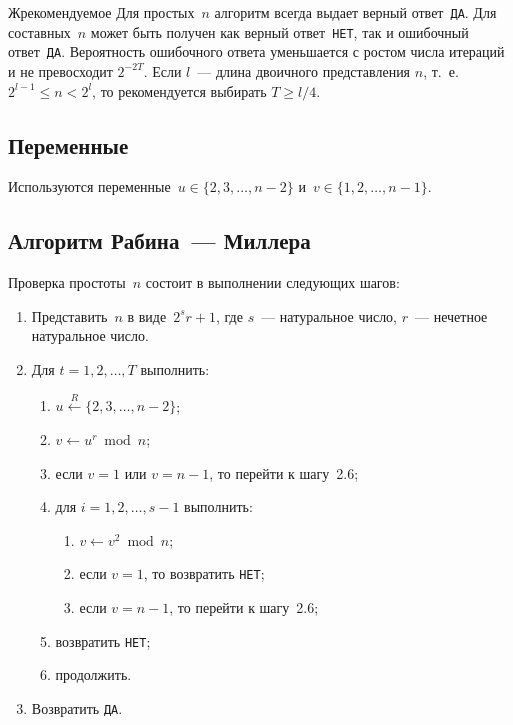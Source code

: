 \begin{appendix}{Ж}{рекомендуемое}
Для простых~$n$ алгоритм всегда выдает верный ответ~\texttt{ДА}. 
%
Для составных~$n$ может быть получен как верный ответ~\texttt{НЕТ},
так и ошибочный ответ~\texttt{ДА}. 
Вероятность ошибочного ответа уменьшается с ростом числа итераций
и не превосходит $2^{-2T}$.
Если $l$~--- длина двоичного представления $n$, т.~е. $2^{l-1}\leq n<2^l$,
то рекомендуется выбирать $T\geq l/4$.

\subsection{Переменные}

Используются переменные~$u\in\{2,3,\ldots,n-2\}$
и~$v\in\{1,2,\ldots,n-1\}$.

\subsection{Алгоритм Рабина~--- Миллера}\label{PRIMEQ.Alg}

Проверка простоты~$n$ состоит в выполнении следующих шагов:
\begin{enumerate}
\item
Представить~$n$ в виде~$2^s r + 1$,
где $s$~--- натуральное число, $r$~--- нечетное натуральное число.

\item
Для $t=1,2,\ldots,T$ выполнить:
\begin{enumerate}
\item
$u\stackrel{R}{\leftarrow}\{2,3,\ldots,n-2\}$;
\item
$v\leftarrow u^r \bmod n$;
\item
если $v=1$ или $v=n-1$, то перейти к шагу~2.6;
\item
для $i=1,2,\ldots,s-1$ выполнить:
\begin{enumerate}
\item
$v\leftarrow v^2\bmod n$;
\item
если $v=1$, то возвратить \texttt{НЕТ};
\item
если $v=n-1$, то перейти к шагу~2.6;
\end{enumerate}
\item
возвратить \texttt{НЕТ};
\item
продолжить.
\end{enumerate}
\item
Возвратить \texttt{ДА}.
\end{enumerate}

\label{LEGENDRE}


\end{appendix}

